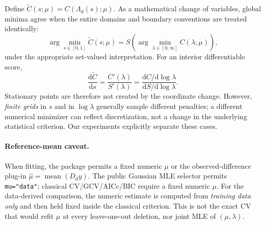 Define $\widetilde C(s;\mu)=C(\Lambda_d(s);\mu)$.
As a mathematical change of variables, global minima
agree when the entire domains and boundary conventions
are treated identically:
\begin{equation}
\arg\min_{s\in[0,1]}\widetilde C(s;\mu)
=S\!\left(\arg\min_{\lambda\in[0,\infty]}
C(\lambda;\mu)\right),
\label{eq:expanded-equiv}
\end{equation}
under the appropriate set-valued interpretation.
For an interior differentiable score,
\[
\frac{\mathrm d\widetilde C}{\mathrm ds}
=\frac{C'(\lambda)}{S'(\lambda)}
=\frac{\mathrm dC/\mathrm d\log\lambda}
       {\mathrm dS/\mathrm d\log\lambda}.
\]
Stationary points are therefore not created by the
coordinate change. However, \emph{finite grids} in $s$
and in $\log\lambda$ generally sample different penalties;
a different numerical minimizer can reflect discretization,
not a change in the underlying statistical criterion.
Our experiments explicitly separate these cases.

\paragraph{Reference-mean caveat.}
When fitting, the package permits a fixed numeric $\mu$
or the observed-difference plug-in
$\widehat\mu=\operatorname{mean}(D_dy)$.
The public Gaussian MLE selector permits \texttt{mu="data"};
classical CV/GCV/AICc/BIC require a fixed numeric $\mu$.
For the data-derived comparison, the numeric estimate
is computed from \emph{training data only} and then
held fixed inside the classical criterion.
This is not the exact CV that would refit $\mu$ at every
leave-one-out deletion, nor joint MLE of $(\mu,\lambda)$.
